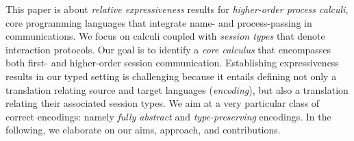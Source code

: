 \noi 
This paper is about \emph{relative expressiveness} results for 
\emph{higher-order process calculi}, core programming languages that 
integrate name- and process-passing in communications.
We focus on calculi coupled with \emph{session types} that denote interaction protocols. 
Our goal is to identify
a \emph{core %
calculus}
that encompasses both first- and higher-order session communication.
Establishing expressiveness results 
in our typed setting 
is challenging because 
 it entails defining 
 not only a translation 
relating source and target languages (\emph{encoding}), but also a translation 
relating their associated session types. 
We aim at a very particular class of correct encodings: namely \emph{fully abstract} and \emph{type-preserving} encodings.
In the following, we elaborate on our aims,   approach, and contributions.

